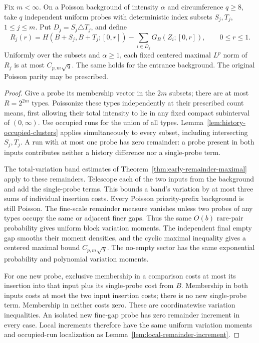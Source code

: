 \documentclass[11pt,letterpaper]{article}
\begin{document}
\begin{lemma}
\label{lem:finite-type-remainder}
Fix $m<\infty$. On a Poisson background of intensity $\alpha$
and circumference $q\ge8$, take $q$ independent uniform probes
with deterministic index subsets $S_j,T_j$, $1\le j\le m$.
Put $D_j=S_j\triangle T_j$, and define
\[
 R_j(r)=H(B+S_j,B+T_j;[0,r])
                  -\sum_{i\in D_j}G_B(Z_i;[0,r]),\qquad 0\le r\le1.
\]
Uniformly over the subsets and $\alpha\ge1$, each fixed
centered maximal $L^p$ norm of $R_j$ is at most
$C_{p,m}\sqrt q$. The same holds for the entrance background.
The original Poisson parity may be prescribed.
\end{lemma}
\begin{proof}
Give a probe its membership vector in the $2m$ subsets;
there are at most $R=2^{2m}$ types.
Poissonize these types independently at their prescribed
count means, first allowing their total intensity to lie
in any fixed compact subinterval of $(0,\infty)$.
Use occupied runs for the union of all types.
Lemma~\ref{lem:history-occupied-clusters} applies simultaneously
to every subset, including intersecting $S_j,T_j$.
A run with at most one probe has zero remainder: a probe
present in both inputs contributes neither a history difference
nor a single-probe term.

The total-variation band estimates of
Theorem~\ref{thm:early-remainder-maximal} apply to these remainders.
Telescope each of the two inputs from the background and
add the single-probe terms. This bounds a band's variation
by at most three sums of individual insertion costs.
Every Poisson priority-prefix background is still Poisson.
The fine-scale remainder measure vanishes unless two probes
of any types occupy the same or adjacent finer gaps.
Thus the same $O(b)$ rare-pair probability gives uniform
block variation moments. The independent final empty gap
smooths their moment densities, and the cyclic maximal
inequality gives a centered maximal bound $C_{p,m}\sqrt q$.
The no-empty sector has the same exponential probability
and polynomial variation moments.

For one new probe, exclusive membership in a comparison
costs at most its insertion into that input plus its
single-probe cost from $B$. Membership in both inputs costs
at most the two input insertion costs; there is no new
single-probe term. Membership in neither costs zero.
These are coordinatewise variation inequalities.
An isolated new fine-gap probe has zero remainder increment
in every case. Local increments therefore have the same
uniform variation moments and occupied-run localization as
Lemma~\ref{lem:local-remainder-increment}.


\end{proof}
\end{document}
